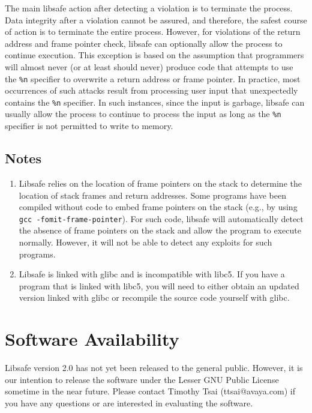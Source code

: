\documentclass[]{article}
\newcommand{\compress}{
	\parskip 0in
	\topsep 0in
	\itemsep 0in
	\partopsep 0in
}
\begin{document}
The main libsafe action after detecting a violation is to terminate the
process.  Data integrity after a violation cannot be assured, and therefore,
the safest course of action is to terminate the entire process.  However, for
violations of the return address and frame pointer check, libsafe can
optionally allow the process to continue execution.  This exception is based on
the assumption that programmers will almost never (or at least should never)
produce code that attempts to use the {\tt \%n} specifier to overwrite a return
address or frame pointer.  In practice, most occurrences of such attacks result
from processing user input that unexpectedly contains the {\tt \%n} specifier.
In such instances, since the input is garbage, libsafe can usually allow the
process to continue to process the input as long as the {\tt \%n} specifier is
not permitted to write to memory.


\subsection{Notes}
\label{subsec:notes}

\begin{enumerate}
\item Libsafe relies on the location of frame pointers on the stack to
    determine the location of stack frames and return addresses.  Some programs
    have been compiled without code to embed frame pointers on the stack (e.g.,
    by using {\tt gcc -fomit-frame-pointer}).  For such code, libsafe will
    automatically detect the absence of frame pointers on the stack and allow
    the program to execute normally.  However, it will not be able to detect
    any exploits for such programs.
\item Libsafe is linked with glibc and is incompatible with libc5.  If you have
    a program that is linked with libc5, you will need to either obtain an
    updated version linked with glibc or recompile the source code yourself
    with glibc.
\end{enumerate}



\section{Software Availability}
\label{sec:software_availability}

Libsafe version 2.0 has not yet been released to the general public.  However,
it is our intention to release the software under the Lesser GNU Public License
sometime in the near future.  Please contact Timothy Tsai (ttsai@avaya.com) if
you have any questions or are interested in evaluating the software.



\begin{singlespace}

\end{singlespace}
\end{document}
